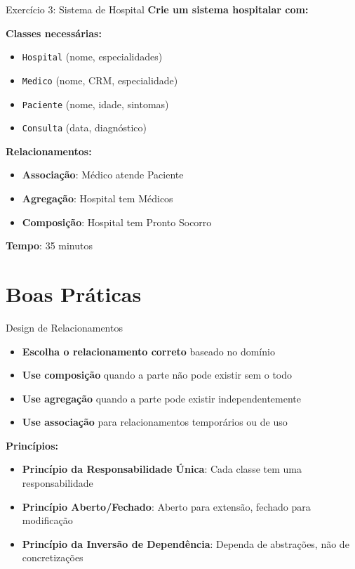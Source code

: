 \documentclass[aspectratio=169]{beamer}
\begin{document}
\begin{frame}{Exercício 3: Sistema de Hospital}
\textbf{Crie um sistema hospitalar com:}

\textbf{Classes necessárias:}
\begin{itemize}
\item \texttt{Hospital} (nome, especialidades)
\item \texttt{Medico} (nome, CRM, especialidade)
\item \texttt{Paciente} (nome, idade, sintomas)
\item \texttt{Consulta} (data, diagnóstico)
\end{itemize}

\textbf{Relacionamentos:}
\begin{itemize}
\item \textbf{Associação}: Médico atende Paciente
\item \textbf{Agregação}: Hospital tem Médicos
\item \textbf{Composição}: Hospital tem Pronto Socorro
\end{itemize}

\vspace{0.3cm}
\textbf{Tempo}: 35 minutos
\end{frame}

\section{Boas Práticas}

\begin{frame}{Design de Relacionamentos}
\begin{itemize}
\item \textbf{Escolha o relacionamento correto} baseado no domínio
\item \textbf{Use composição} quando a parte não pode existir sem o todo
\item \textbf{Use agregação} quando a parte pode existir independentemente
\item \textbf{Use associação} para relacionamentos temporários ou de uso
\end{itemize}

\vspace{0.5cm}
\textbf{Princípios:}
\begin{itemize}
\item \textbf{Princípio da Responsabilidade Única}: Cada classe tem uma responsabilidade
\item \textbf{Princípio Aberto/Fechado}: Aberto para extensão, fechado para modificação
\item \textbf{Princípio da Inversão de Dependência}: Dependa de abstrações, não de concretizações
\end{itemize}
\end{frame}
\end{document}
